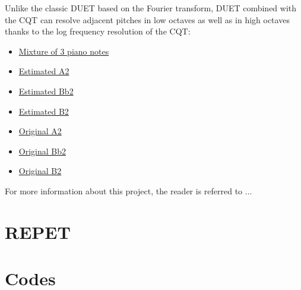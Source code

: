 \documentclass{article}
\begin{document}
Unlike the classic DUET based on the Fourier transform, DUET combined with the CQT can resolve adjacent pitches in low octaves as well as in high octaves thanks to the log frequency resolution of the CQT:
\begin{itemize}[noitemsep,topsep=0pt]
\item \href{Audio/DUET/piano_mixture.mp3}{Mixture of 3 piano notes}
\item \href{Audio/DUET/A2_estimated.mp3}{Estimated A2}
\item \href{Audio/DUET/Bb2_estimated.mp3}{Estimated Bb2}
\item \href{Audio/DUET/B2_estimated.mp3}{Estimated B2}
\item \href{Audio/DUET/A2_original.mp3}{Original A2}
\item \href{Audio/DUET/Bb2_original.mp3}{Original Bb2}
\item \href{Audio/DUET/B2_original.mp3}{Original B2}
\end{itemize}




For more information about this project, the reader is referred to ...


\section{REPET}
\label{sec:repet}


\section{Codes}
\label{sec:codes}


\printbibheading[title={References},heading=bibnumbered]
\label{sec:refs}
\printbibliography[title={Patents},type=patent,heading=subbibnumbered]
\printbibliography[title={Journal Articles},type=article,heading=subbibnumbered]
\printbibliography[title={Conference Proceedings},type=inproceedings,heading=subbibnumbered]
\printbibliography[title={Book Chapters},type=inbook,heading=subbibnumbered]
\printbibliography[title={Technical Reports},type=report,heading=subbibnumbered]
\printbibliography[title={Talks},type=misc,heading=subbibnumbered]
\printbibliography[title={Data Sets},type=online,heading=subbibnumbered]

%
%
\end{document}
